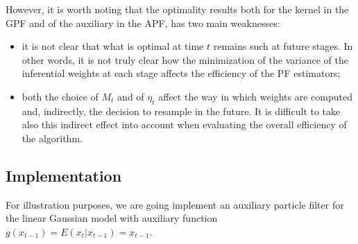 \documentclass[
]{book}
\theoremstyle{break}
\theoremstyle{nonumberplain}
\begin{document}
However, it is worth noting that the optimality results both for the
kernel in the GPF and of the auxiliary in the APF, has two main
weaknesses:

\begin{itemize}
    \item it is not clear that what is optimal at time $t$ remains such at future stages. In other words, it is not truly clear how the minimization of the variance of the inferential weights at each stage affects the efficiency of the PF estimators;
    \item both the choice of $M_t$ and of $\eta_t$ affect the way in which weights are computed and, indirectly, the decision to resample in the future. It is difficult to take also this indirect effect into account when evaluating the  overall efficiency of the algorithm.
\end{itemize}

\subsection{Implementation}

For illustration purposes, we are going implement an auxiliary particle
filter for the linear Gaussian model with auxiliary function
\(g(x_{t-1})=E(x_{t}|x_{t-1})=x_{t-1}\).
\end{document}
